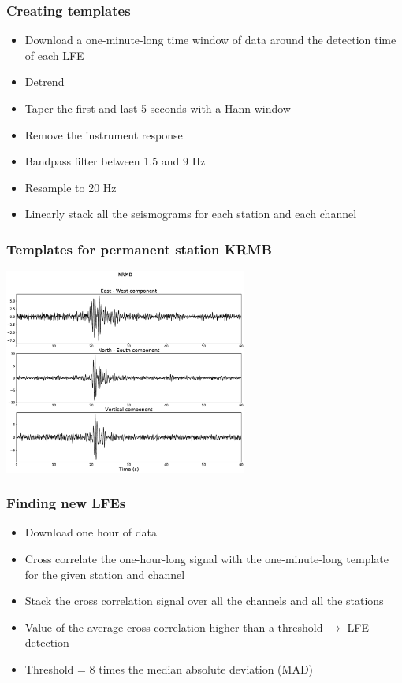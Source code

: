 \documentclass{beamer}
\begin{document}
	\begin{frame}
		\frametitle{Creating templates}
		\begin{itemize}
			\item Download a one-minute-long time window of data around the detection time of each LFE
			\item Detrend
			\item Taper the first and last 5 seconds with a Hann window
			\item Remove the instrument response
			\item Bandpass filter between 1.5 and 9 Hz
			\item Resample to 20 Hz
			\item Linearly stack all the seismograms for each station and each channel
		\end{itemize}
	\end{frame}

	\begin{frame}
		\frametitle{Templates for permanent station KRMB}
		\begin{center}
			\includegraphics[width=8cm, trim={4cm 2cm 4cm 3cm}, clip]{catalog_SC/08042114048_KRMB.eps}
		\end{center}
	\end{frame}

	\begin{frame}
		\frametitle{Finding new LFEs}
		\begin{itemize}
			\item Download one hour of data
			\item Cross correlate the one-hour-long signal with the one-minute-long template for the given station and channel
			\item Stack the cross correlation signal over all the channels and all the stations
			\item Value of the average cross correlation higher than a threshold $\rightarrow$ LFE detection
			\item Threshold = 8 times the median absolute deviation (MAD)
		\end{itemize}
	\end{frame}
\end{document}

